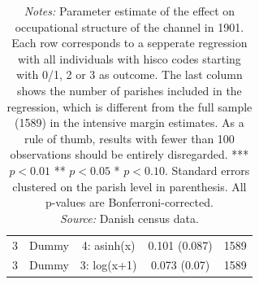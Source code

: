 \begin{table}
\begin{tabular}{ccccc}
3 & Dummy & 4: asinh(x) & 0.101 (0.087) & 1589\\
3 & Dummy & 3: log(x+1) & 0.073 (0.07) & 1589\\
\bottomrule
\end{tabular}
\parbox{0.9\textwidth}{
\caption*{\footnotesize \textit{Notes:} Parameter estimate of the effect on occupational structure of the channel in 1901. Each row corresponds to a sepperate regression with all individuals with hisco codes starting with 0/1, 2 or 3 as outcome. The last column shows the number of parishes included in the regression, which is different from the full sample (1589) in the intensive margin estimates. As a rule of thumb, results with fewer than 100 observations should be entirely disregarded. *** $p< 0.01$ ** $p< 0.05$ * $p< 0.10$. Standard errors clustered on the parish level in parenthesis. All p-values are Bonferroni-corrected. \\ \textit{Source:} Danish census data.}
}
\end{table}

